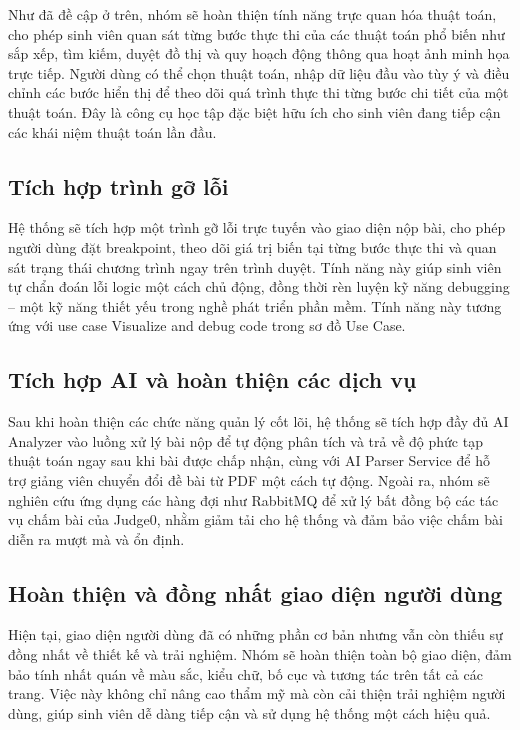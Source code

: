 \documentclass[12pt, a4paper]{report}
\begin{document}
Như đã đề cập ở trên, nhóm sẽ hoàn thiện tính năng trực quan hóa thuật toán, cho phép sinh viên quan sát từng bước thực thi của các thuật toán phổ biến như sắp xếp, tìm kiếm, duyệt đồ thị và quy hoạch động thông qua hoạt ảnh minh họa trực tiếp. Người dùng có thể chọn thuật toán, nhập dữ liệu đầu vào tùy ý và điều chỉnh các bước hiển thị để theo dõi quá trình thực thi từng bước chi tiết của một thuật toán. Đây là công cụ học tập đặc biệt hữu ích cho sinh viên đang tiếp cận các khái niệm thuật toán lần đầu.

\subsection{Tích hợp trình gỡ lỗi}

Hệ thống sẽ tích hợp một trình gỡ lỗi trực tuyến vào giao diện nộp bài, cho phép người dùng đặt breakpoint, theo dõi giá trị biến tại từng bước thực thi và quan sát trạng thái chương trình ngay trên trình duyệt. Tính năng này giúp sinh viên tự chẩn đoán lỗi logic một cách chủ động, đồng thời rèn luyện kỹ năng debugging -- một kỹ năng thiết yếu trong nghề phát triển phần mềm. Tính năng này tương ứng với use case Visualize and debug code trong sơ đồ Use Case.

\subsection{Tích hợp AI và hoàn thiện các dịch vụ}

Sau khi hoàn thiện các chức năng quản lý cốt lõi, hệ thống sẽ tích hợp đầy đủ AI Analyzer vào luồng xử lý bài nộp để tự động phân tích và trả về độ phức tạp thuật toán ngay sau khi bài được chấp nhận, cùng với AI Parser Service để hỗ trợ giảng viên chuyển đổi đề bài từ \ac{PDF} một cách tự động. Ngoài ra, nhóm sẽ nghiên cứu ứng dụng các hàng đợi như RabbitMQ để xử lý bất đồng bộ các tác vụ chấm bài của Judge0, nhằm giảm tải cho hệ thống và đảm bảo việc chấm bài diễn ra mượt mà và ổn định.

\subsection{Hoàn thiện và đồng nhất giao diện người dùng}

Hiện tại, giao diện người dùng đã có những phần cơ bản nhưng vẫn còn thiếu sự đồng nhất về thiết kế và trải nghiệm. Nhóm sẽ hoàn thiện toàn bộ giao diện, đảm bảo tính nhất quán về màu sắc, kiểu chữ, bố cục và tương tác trên tất cả các trang. Việc này không chỉ nâng cao thẩm mỹ mà còn cải thiện trải nghiệm người dùng, giúp sinh viên dễ dàng tiếp cận và sử dụng hệ thống một cách hiệu quả.
\end{document}
